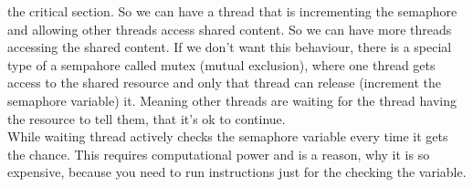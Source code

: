 \documentclass[a4paper]{article}
\begin{document}
the critical section. So we can have a thread that is incrementing the semaphore and allowing
other threads access shared content. So we can have more threads accessing the shared content. 
If we don't want this behaviour, there is a special type of a sempahore called
mutex (mutual exclusion), where one thread gets access to the shared resource and only that thread
can release (increment the semaphore variable) it. Meaning other threads are waiting for 
the thread having the resource to tell them, that it's ok to continue.
\\
While waiting thread actively checks the semaphore variable every time it gets the chance. This 
requires computational power and is a reason, why it is so expensive, because you need to run 
instructions just for the checking the variable.

\newpage
\printbibliography
\end{document}
